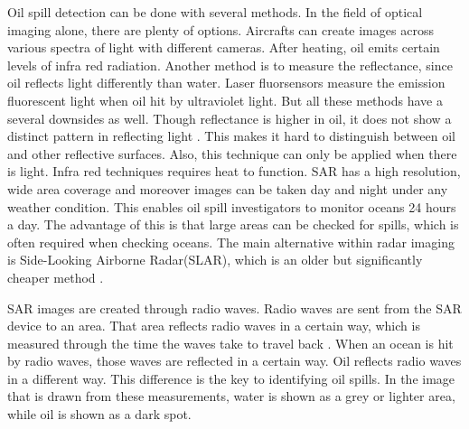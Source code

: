 Oil spill detection can be done with several methods. In the field of optical imaging alone, there are plenty of options. Aircrafts can create images across various spectra of light with different cameras. After heating, oil emits certain levels of infra red radiation. Another method is to measure the reflectance, since oil reflects light differently than water. Laser fluorsensors measure the emission fluorescent light when oil hit by ultraviolet light. But all these methods have a several downsides as well. Though reflectance is higher in oil, it does not show a distinct pattern in reflecting light \cite{fingas2014review}. This makes it hard to distinguish between oil and other reflective surfaces. Also, this technique can only be applied when there is light. Infra red techniques requires heat to function.
SAR has a high resolution, wide area coverage and moreover images can be taken day and night under any weather condition. This enables oil spill investigators to monitor oceans 24 hours a day\cite{Chang20081915}. The advantage of this is that large areas can be checked for spills, which is often required when checking oceans. 
The main alternative within radar imaging is Side-Looking Airborne Radar(SLAR), which is an older but significantly cheaper method \cite{fingas2014review}. 

SAR images are created through radio waves. Radio waves are sent from the SAR device to an area. That area reflects radio waves in a certain way, which is measured through the time the waves take to travel back  \cite{Doerry:04}. When an ocean is hit by radio waves, those waves are reflected in a certain way. Oil reflects radio waves in a different way. This difference is the key to identifying oil spills.
In the image that is drawn from these measurements, water is shown as a grey or lighter area, while oil is shown as a dark spot. 







